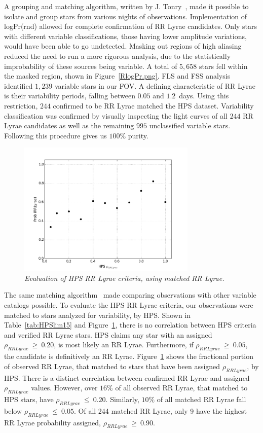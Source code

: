 \documentclass[aps,prb,twocolumn,superscriptaddress]{revtex4-1}
\begin{document}
A grouping and matching algorithm, written by J. Tonry~\cite{gri}, made it possible to isolate and group 
stars from various nights of observations.  
Implementation of logPr(rnd) allowed for complete confirmation of RR Lyrae candidates.  Only stars with different 
variable classifications, those having lower amplitude variations, would have been able to go
undetected.  Masking out regions of high aliasing reduced the need to run a more rigorous analysis, %
due to the statistically improbability of these sources being variable.  A total of $5,658$ stars fell within 
the masked region, shown in Figure~\ref{RlogPr.png}.  FLS and FSS analysis identified $1,239$ variable stars in our FOV.  
A defining characteristic of RR Lyrae is their variability periods, falling between $0.05$ and $1.2$~days.  Using this 
restriction, $244$ confirmed to be RR Lyrae matched the HPS dataset.  Variability classification was confirmed by visually inspecting 
the light curves of all $244$ RR Lyrae candidates as well as the remaining $995$ unclassified variable stars.  Following this procedure gives us $100\%$ purity.

\begin{figure}[H]
 \centering
 	\includegraphics[width=3.35in]{figures/NEW/probrr_vs_HPS.png}
 \caption{\it \small{Evaluation of HPS RR Lyrae criteria, using matched RR Lyrae.}}
 \label{fig:probrrHPS}
\end{figure}

The same matching algorithm~\cite{gri} made comparing observations with other variable catalogs possible.  
To evaluate the HPS RR Lyrae criteria, our observations were matched to stars analyzed for variability, by HPS.  
Shown in Table~\ref{tab:HPSlim15} and Figure~\ref{fig:probrrHPS}, there is no correlation between HPS criteria and 
verified RR Lyrae stars.  HPS claims any star with an assigned $\rho_{RRLyrae}~\geq~0.20$, is most likely an RR Lyrae.  Furthermore, 
if $\rho_{RRLyrae}~\geq~0.05$, the candidate is definitively an RR Lyrae.  Figure~\ref{fig:probrrHPS} shows the fractional 
portion of observed RR Lyrae, that matched to stars that have been assigned $\rho_{RRLyrae}$, by HPS.
There is a distinct correlation between confirmed RR Lyrae and assigned $\rho_{RRLyrae}$ values.  However, over $16\%$ of 
all observed RR Lyrae, that matched to HPS stars, have $\rho_{RRLyrae}~\leq~0.20$.  Similarly, $10\%$ of all matched RR Lyrae 
fall below $\rho_{RRLyrae}~\leq~0.05$.  Of all 244 matched RR Lyrae, only 9 have the highest RR Lyrae 
probability assigned, $\rho_{RRLyrae}~\geq~0.90$.
\end{document}
